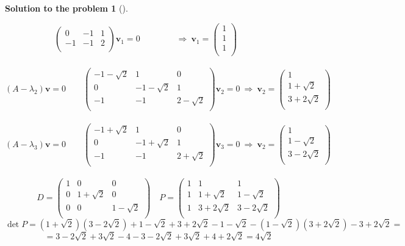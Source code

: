 \documentclass[12pt,a4]{article}
\newtheorem{solution}{Solution to the problem}
\newcommand{\bv}{{\mathbf v}}
\begin{document}
{\begin{solution}[]
\begin{enumerate}[(a)]
\[\begin{pmatrix}
0 & -1 & 1 \\
-1 & -1 & 2 \\
\end{pmatrix}
\bv_1
= 0
\qquad\qquad
~\Rightarrow~
\bv_1 = \begin{pmatrix}
1 \\ 1 \\ 1\\
\end{pmatrix}
\qquad\quad
\]\\
\[
(A-\lambda_2)\bv = 0
\qquad
\begin{pmatrix}
-1-\sqrt2 & 1 & 0 \\
0 & -1-\sqrt2 & 1 \\
-1 & -1 & 2-\sqrt2 \\
\end{pmatrix}
\bv_2
= 0
~\Rightarrow~
\bv_2 = \begin{pmatrix}
1 \\ 1+\sqrt2 \\ 3+2\sqrt2\\
\end{pmatrix}
\]\\
\[
(A-\lambda_3)\bv = 0
\qquad
\begin{pmatrix}
-1+\sqrt2 & 1 & 0 \\
0 & -1+\sqrt2 & 1 \\
-1 & -1 & 2+\sqrt2 \\
\end{pmatrix}
\bv_3
= 0
~\Rightarrow~
\bv_2 = \begin{pmatrix}
1 \\ 1-\sqrt2 \\ 3-2\sqrt2\\
\end{pmatrix}
\]\\
\[
D = 
\begin{pmatrix}
1 & 0 & 0 \\
0 & 1+\sqrt2 & 0\\
0 & 0 & 1-\sqrt2\\
\end{pmatrix}
\quad
P = 
\begin{pmatrix}
1 & 1 & 1\\
1 & 1+\sqrt2 & 1-\sqrt2\\
1 & 3+2\sqrt2 & 3-2\sqrt2\\
\end{pmatrix}
\]
\[
\det P = 
(1+\sqrt2)(3-2\sqrt2)+1-\sqrt2+3+2\sqrt2-1-\sqrt2-(1-\sqrt2)(3+2\sqrt2)-3+2\sqrt2=
\]
\[
=
3-2\sqrt2 + 3\sqrt2-4-3-2\sqrt2+3\sqrt2+4+2\sqrt2
=
4\sqrt2
\]
\[
\]
\end{enumerate}
\end{solution}}
\end{document}
